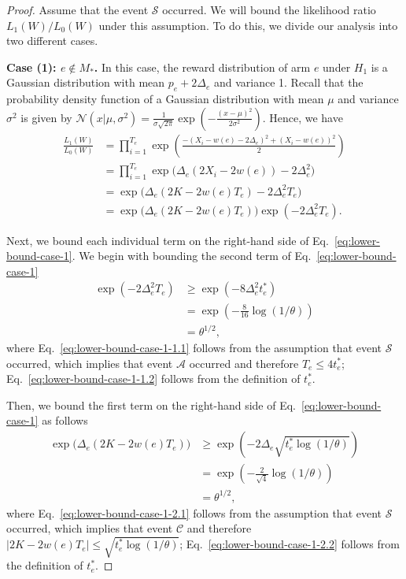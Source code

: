 \documentclass{article}
\begin{document}
\begin{spacing}{1.1}
\begin{proof}
Assume that the event $\mathcal S$ occurred.
We will bound the likelihood ratio $L_1(W)/L_0(W)$ under this assumption. 
To do this, we divide our analysis into two different cases.

\textbf{Case (1): $e\not \in M_*$.}
In this case, the reward distribution of arm $e$ under $H_1$ is a Gaussian distribution with mean $p_e+2\Delta_e$ and variance 1. 
Recall that the probability density function of a Gaussian distribution with mean $\mu$ and variance $\sigma^2$ is given by
$\mathcal N(x | \mu,\sigma^2)=\frac{1}{\sigma\sqrt{2\pi}}\exp\left(-\frac{(x-\mu)^2}{2\sigma^2}\right)$.
Hence, we have
\begin{align}
  \frac{L_1(W)}{L_0(W)} &= \prod_{i=1}^{T_e} \exp\left(\frac{-(X_i-w(e)-2\Delta_e)^2+(X_i-w(e))^2}{2}\right) \nonumber \\
  						&= \prod_{i=1}^{T_e} \exp\big(\Delta_e(2X_i-2w(e))-2\Delta_e^2\big) \nonumber \\
  						&= \exp\big(\Delta_e(2K-2w(e)T_e)-2\Delta_e^2T_e\big) \nonumber \\
  						&= \exp\big(\Delta_e(2K-2w(e)T_e)\big)\exp(-2\Delta_e^2T_e) \label{eq:lower-bound-case-1}.
\end{align}

Next, we bound each individual term on the right-hand side of Eq.~\eqref{eq:lower-bound-case-1}.
We begin with bounding the second term of Eq.~\eqref{eq:lower-bound-case-1}
\begin{align}
	\exp(-2\Delta_e^2T_e) &\ge \exp(-8\Delta_e^2t_e^*) \label{eq:lower-bound-case-1-1.1} \\
						  &=\exp\left(-\frac{8}{16}\log(1/\theta)\right) \label{eq:lower-bound-case-1-1.2}\\
						  &= \theta^{1/2}\label{eq:lower-bound-case-1-1.3},
\end{align}
where Eq.~\eqref{eq:lower-bound-case-1-1.1} follows from the assumption that event $\mathcal S$ occurred, which implies that event $\mathcal A$ occurred and therefore $T_e \le 4t_e^*$; Eq.~\eqref{eq:lower-bound-case-1-1.2} follows from the definition of $t_e^*$.

Then, we bound the first term on the right-hand side of Eq.~\eqref{eq:lower-bound-case-1} as follows
\begin{align}
	\exp\big(\Delta_e(2K-2w(e)T_e)\big) & \ge \exp\left(-2\Delta_e\sqrt{t_e^*\log(1/\theta)}\right) \label{eq:lower-bound-case-1-2.1}\\
								       & = \exp\left(-\frac{2}{\sqrt{4}}\log(1/\theta)\right) \label{eq:lower-bound-case-1-2.2}\\
								       &=\theta^{1/2},  \label{eq:lower-bound-case-1-2.3}
\end{align}
where Eq.~\eqref{eq:lower-bound-case-1-2.1} follows from the assumption that event $\mathcal S$ occurred, which implies that event $\mathcal C$ and therefore $|2K-2w(e)T_e| \le \sqrt{t_e^*\log(1/\theta)}$; 
Eq.~\eqref{eq:lower-bound-case-1-2.2} follows from the definition of $t_e^*$.


\end{proof}
\end{spacing}
\end{document}
